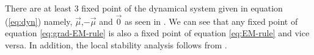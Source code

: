 \begin{remark}
There are at least 3 fixed point of the dynamical system given in equation (\ref{eq:dyn}) namely,  $\vec{\mu}$,$-\vec{\mu}$ and $\vec{0}$ as seen in \cite{Nagarajan and Panageas}. We can see that any fixed point of equation \ref{eq:grad-EM-rule} is also a fixed point of equation \ref{eq:EM-rule} and vice versa. In addition, the local stability analysis follows from \cite{Nagarajan and Panageas}.
\end{remark}







